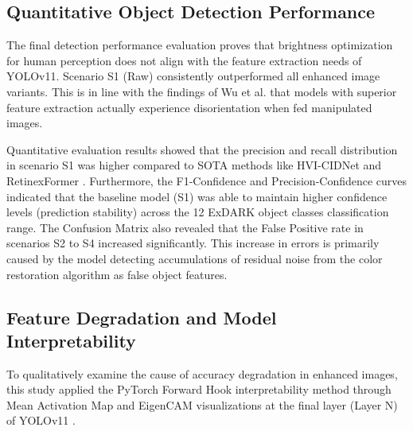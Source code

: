 \documentclass[conference]{IEEEtran}
\begin{document}

\subsection{Quantitative Object Detection Performance} The final detection performance evaluation proves that brightness optimization for human perception does not align with the feature extraction needs of YOLOv11. Scenario S1 (Raw) consistently outperformed all enhanced image variants. This is in line with the findings of Wu et al. \cite{wu2024llieeffect} that models with superior feature extraction actually experience disorientation when fed manipulated images.

Quantitative evaluation results showed that the precision and recall distribution in scenario S1 was higher compared to SOTA methods like HVI-CIDNet \cite{yan2025hvi} and RetinexFormer \cite{cai2023retinexformer}. Furthermore, the F1-Confidence and Precision-Confidence curves indicated that the baseline model (S1) was able to maintain higher confidence levels (prediction stability) across the 12 ExDARK object classes classification range. The Confusion Matrix also revealed that the False Positive rate in scenarios S2 to S4 increased significantly. This increase in errors is primarily caused by the model detecting accumulations of residual noise from the color restoration algorithm as false object features.


\subsection{Feature Degradation and Model Interpretability} To qualitatively examine the cause of accuracy degradation in enhanced images, this study applied the PyTorch Forward Hook interpretability method through Mean Activation Map and EigenCAM visualizations at the final layer (Layer N) of YOLOv11 \cite{metrics2026formulas}.
\end{document}
